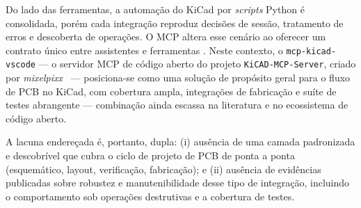 Do lado das ferramentas, a automação do KiCad por \emph{scripts} Python é
consolidada, porém cada integração reproduz decisões de sessão, tratamento de
erros e descoberta de operações. O MCP altera esse cenário ao oferecer um
contrato único entre assistentes e ferramentas \citep{mcp2025spec}. Neste
contexto, o \texttt{mcp-kicad-vscode} --- o servidor MCP de código aberto do
projeto \texttt{KiCAD-MCP-Server}, criado por
\emph{mixelpixx}~\citep{kicadmcpserver} --- posiciona-se como uma solução de
propósito geral para o fluxo de PCB no KiCad, com cobertura ampla, integrações
de fabricação e suíte de testes abrangente --- combinação ainda escassa na
literatura e no ecossistema de código aberto.

A lacuna endereçada é, portanto, dupla: (i) ausência de uma camada padronizada
e descobrível que cubra o ciclo de projeto de PCB de ponta a ponta
(esquemático, layout, verificação, fabricação); e (ii) ausência de evidências
publicadas sobre robustez e manutenibilidade desse tipo de integração,
incluindo o comportamento sob operações destrutivas e a cobertura de testes.
